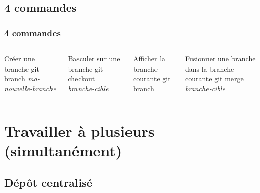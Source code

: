 \documentclass[t,11pt]{beamer}
\begin{document}
\subsection{4 commandes}
\begin{frame}
        \frametitle{4 commandes}

        \begin{columns}

                \begin{block}{Créer une branche}
                        git branch \emph{ma-nouvelle-branche}
                \end{block}

                \begin{block}{Basculer sur une branche}
                        git checkout \emph{branche-cible}
                \end{block}


                \begin{block}{Afficher la branche courante}
                        git branch
                \end{block}

                \begin{block}{Fusionner une branche dans la branche courante}
                        git merge \emph{branche-cible}
                \end{block}

        \end{columns}

\end{frame}

\section{Travailler \`a plusieurs (simultan\'ement) }

\subsection{D\'ep\^ot centralis\'e}
\end{document}
